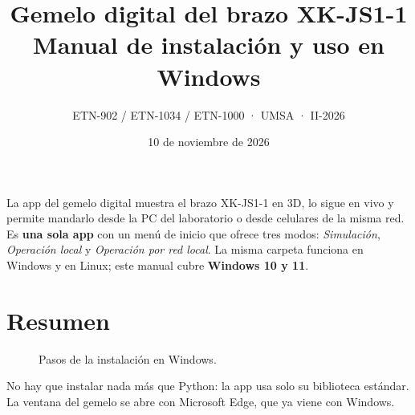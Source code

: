 \documentclass[a4paper,11pt]{article}
\title{\textbf{Gemelo digital del brazo XK-JS1-1}\\[4pt]\large Manual de instalación y uso en Windows}
\author{ETN-902 / ETN-1034 / ETN-1000 · UMSA · II-2026}
\date{10 de noviembre de 2026}
\begin{document}
\maketitle
\thispagestyle{fancy}

La app del gemelo digital muestra el brazo XK-JS1-1 en 3D, lo sigue en vivo y permite mandarlo desde la PC del laboratorio o desde celulares de la misma red. Es \textbf{una sola app} con un menú de inicio que ofrece tres modos: \emph{Simulación}, \emph{Operación local} y \emph{Operación por red local}. La misma carpeta funciona en Windows y en Linux; este manual cubre \textbf{Windows 10 y 11}.

\tableofcontents
\newpage

\section{Resumen}
\begin{figure}[H]
\centering
{}
\caption{Pasos de la instalación en Windows.}
\end{figure}
No hay que instalar nada más que Python: la app usa solo su biblioteca estándar. La ventana del gemelo se abre con Microsoft Edge, que ya viene con Windows.

\end{document}
